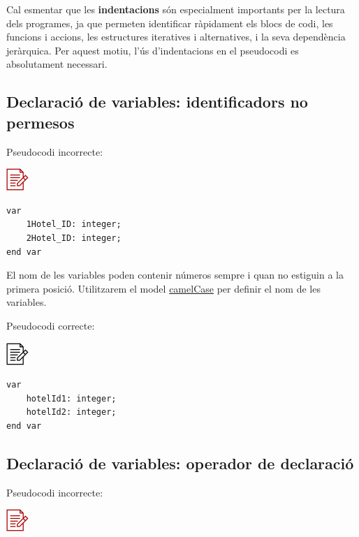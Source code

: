 \documentclass[
]{book}
\begin{document}
Cal esmentar que les \textbf{indentacions} són especialment importants per la lectura dels programes, ja que permeten identificar ràpidament els blocs de codi, les funcions i accions, les estructures iteratives i alternatives, i la seva dependència jeràrquica. Per aquest motiu, l'ús d'indentacions en el pseudocodi es absolutament necessari.

\hypertarget{declaraciuxf3-de-variables-identificadors-no-permesos}{%
\subsection{Declaració de variables: identificadors no permesos}\label{declaraciuxf3-de-variables-identificadors-no-permesos}}

Pseudocodi incorrecte:

\includegraphics{./img/alg_err.png}

\begin{verbatim}
var
    1Hotel_ID: integer;
    2Hotel_ID: integer;
end var
\end{verbatim}

El nom de les variables poden contenir números sempre i quan no estiguin a la primera posició. Utilitzarem el model \href{https://en.wikipedia.org/wiki/Camel_case}{camelCase} per definir el nom de les variables.

Pseudocodi correcte:

\includegraphics{./img/alg.png}

\begin{verbatim}
var
    hotelId1: integer;
    hotelId2: integer;
end var
\end{verbatim}

\hypertarget{declaraciuxf3-de-variables-operador-de-declaraciuxf3}{%
\subsection{Declaració de variables: operador de declaració}\label{declaraciuxf3-de-variables-operador-de-declaraciuxf3}}

Pseudocodi incorrecte:

\includegraphics{./img/alg_err.png}
\end{document}

